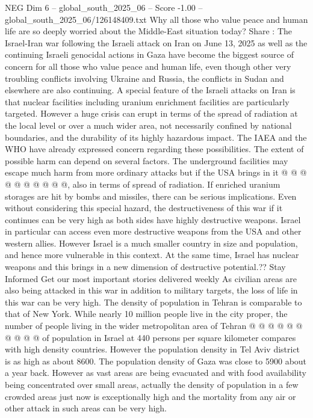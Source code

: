 \begin{textsample}{NEG Dim 6 – global\_south\_2025\_06 – Score -1.00 – global\_south\_2025\_06/126148409.txt}  \label{ex:f6_neg_437}
Why all those who value peace and human life are so deeply worried about the Middle-East situation today?
Share : The Israel-Iran war following the Israeli attack on Iran on June 13, 2025 as well as the continuing Israeli genocidal actions in Gaza have become the biggest source of concern for all those who value peace and human life, even though other very troubling conflicts involving Ukraine and Russia, the conflicts in Sudan and elsewhere are also continuing.
A special feature of the Israeli attacks on Iran is that nuclear facilities including uranium enrichment facilities are particularly targeted.
However a huge crisis can erupt in terms of the spread of radiation at the local level or over a much wider area, not necessarily confined by national boundaries, and the durability of its highly hazardous impact.
The IAEA and the WHO have already expressed concern regarding these possibilities.
The extent of possible harm can depend on several factors.
The underground facilities may escape much harm from more ordinary attacks but if the USA brings in it @ @ @ @ @ @ @ @ @ @, also in terms of spread of radiation.
If enriched uranium storages are hit by bombs and missiles, there can be serious implications.
Even without considering this special hazard, the destructiveness of this war if it continues can be very high as both sides have highly destructive weapons.
Israel in particular can access even more destructive weapons from the USA and other western allies.
However Israel is a much smaller country in size and population, and hence more vulnerable in this context.
At the same time, Israel has nuclear weapons and this brings in a new dimension of destructive potential.??
Stay Informed Get our most important stories delivered weekly As civilian areas are also being attacked in this war in addition to military targets, the loss of life in this war can be very high.
The density of population in Tehran is comparable to that of New York.
While nearly 10 million people live in the city proper, the number of people living in the wider metropolitan area of Tehran @ @ @ @ @ @ @ @ @ @ of population in Israel at 440 persons per square kilometer compares with high density countries.
However the population density in Tel Aviv district is as high as about 8600.
The population density of Gaza was close to 5900 about a year back.
However as vast areas are being evacuated and with food availability being concentrated over small areas, actually the density of population in a few crowded areas just now is exceptionally high and the mortality from any air or other attack in such areas can be very high.

\end{textsample}
